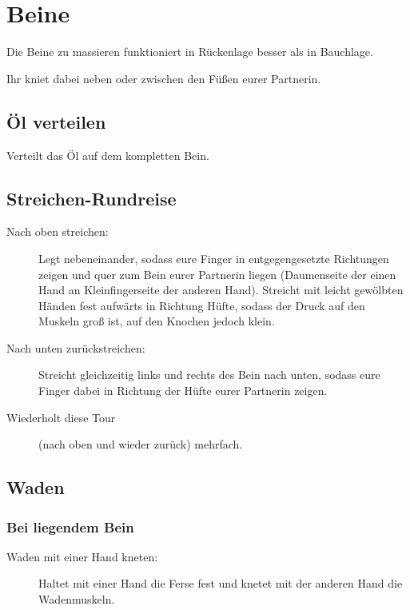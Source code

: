\section{Beine}

Die Beine zu massieren funktioniert in Rückenlage besser als in Bauchlage.

Ihr kniet dabei neben oder zwischen den Füßen eurer Partnerin.

\subsection{Öl verteilen}
Verteilt das Öl auf dem kompletten Bein.

\subsection{Streichen-Rundreise}
\begin{oframed}
  \begin{description}
    \item [Nach oben streichen:] Legt  nebeneinander, sodass eure Finger in entgegengesetzte Richtungen zeigen und quer zum Bein eurer Partnerin liegen (Daumenseite der einen Hand an Kleinfingerseite der anderen Hand). Streicht mit leicht gewölbten Händen fest aufwärts in Richtung Hüfte, sodass der Druck auf den Muskeln groß ist, auf den Knochen jedoch klein.
    \item [Nach unten zurückstreichen:] Streicht gleichzeitig links und rechts des Bein nach unten, sodass eure Finger dabei in Richtung der Hüfte eurer Partnerin zeigen.
    \item [Wiederholt diese Tour] (nach oben und wieder zurück) mehrfach.
  \end{description}
\end{oframed}

\subsection{Waden}

\subsubsection{Bei liegendem Bein}

\begin{description}
  \item [Waden mit einer Hand kneten:] Haltet mit einer Hand die Ferse fest und knetet mit der anderen Hand die Wadenmuskeln.
\end{description}

